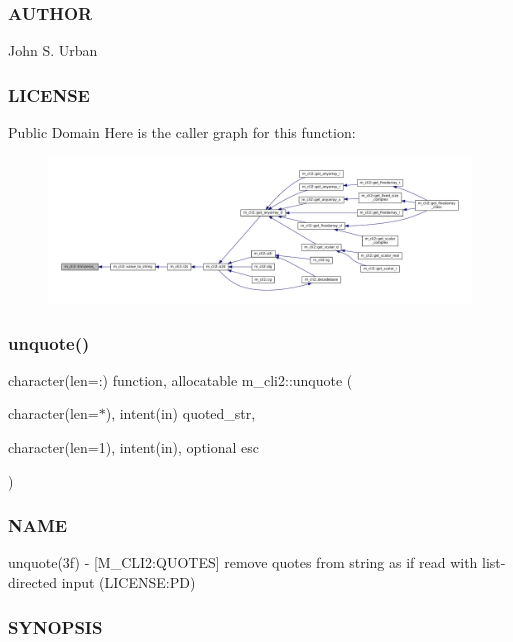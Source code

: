 \subsubsection*{A\+U\+T\+H\+OR}

John S. Urban \subsubsection*{L\+I\+C\+E\+N\+SE}

Public Domain Here is the caller graph for this function\+:\nopagebreak
\begin{figure}[H]
\begin{center}
\leavevmode
\includegraphics[width=350pt]{namespacem__cli2_a770a66475094fd80493d46498de1ebf7_icgraph}
\end{center}
\end{figure}
\mbox{\label{namespacem__cli2_a9cab7352414f8b5625330a9ff5cf0cb4}} 
\subsubsection{\texorpdfstring{unquote()}{unquote()}}
{\footnotesize\ttfamily character(len=\+:) function, allocatable m\+\_\+cli2\+::unquote (\begin{DoxyParamCaption}\item[{character(len=$\ast$), intent(in)}]{quoted\+\_\+str,  }\item[{character(len=1), intent(in), optional}]{esc }\end{DoxyParamCaption})\hspace{0.3cm}{\ttfamily [private]}}



\subsubsection*{N\+A\+ME}

unquote(3f) -\/ \mbox{[}M\+\_\+\+C\+L\+I2\+:Q\+U\+O\+T\+ES\mbox{]} remove quotes from string as if read with list-\/directed input (L\+I\+C\+E\+N\+SE\+:PD) \subsubsection*{S\+Y\+N\+O\+P\+S\+IS}

